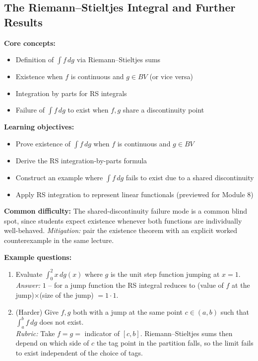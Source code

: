 \documentclass[11pt]{article}
\begin{document}
\subsection{The Riemann--Stieltjes Integral and Further Results}

\textbf{Core concepts:}
\begin{itemize}[nosep]
\item Definition of $\int f\,dg$ via Riemann--Stieltjes sums
\item Existence when $f$ is continuous and $g\in BV$ (or vice versa)
\item Integration by parts for RS integrals
\item Failure of $\int f\,dg$ to exist when $f,g$ share a discontinuity point
\end{itemize}

\textbf{Learning objectives:}
\begin{itemize}[nosep]
\item Prove existence of $\int f\,dg$ when $f$ is continuous and $g\in BV$
\item Derive the RS integration-by-parts formula
\item Construct an example where $\int f\,dg$ fails to exist due to a shared discontinuity
\item Apply RS integration to represent linear functionals (previewed for Module 8)
\end{itemize}

\textbf{Common difficulty:} The shared-discontinuity failure mode is a common blind spot, since students expect existence whenever both functions are individually well-behaved. \textit{Mitigation:} pair the existence theorem with an explicit worked counterexample in the same lecture.

\textbf{Example questions:}
\begin{enumerate}[nosep]
\item Evaluate $\int_0^2 x\,dg(x)$ where $g$ is the unit step function jumping at $x=1$. \\
\textit{Answer:} $1$ -- for a jump function the RS integral reduces to (value of $f$ at the jump)$\times$(size of the jump) $=1\cdot1$.
\item (Harder) Give $f,g$ both with a jump at the same point $c\in(a,b)$ such that $\int_a^b f\,dg$ does not exist. \\
\textit{Rubric:} Take $f=g=$ indicator of $[c,b]$. Riemann--Stieltjes sums then depend on which side of $c$ the tag point in the partition falls, so the limit fails to exist independent of the choice of tags.
\end{enumerate}
\end{document}
